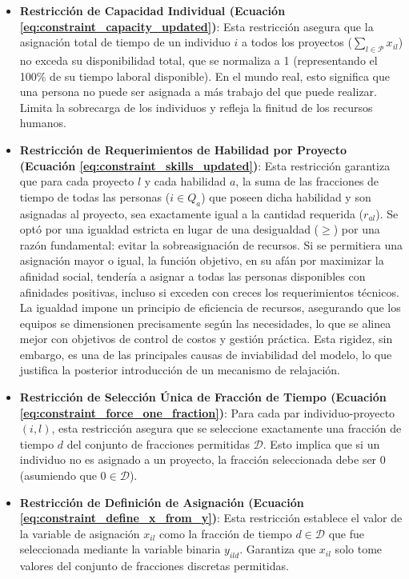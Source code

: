 \documentclass[conference]{IEEEtran}
\begin{document}
\begin{itemize}
    \item \textbf{Restricción de Capacidad Individual (Ecuación \ref{eq:constraint_capacity_updated})}: Esta restricción asegura que la asignación total de tiempo de un individuo \(i\) a todos los proyectos (\(\sum_{l \in \mathcal{P}} x_{il}\)) no exceda su disponibilidad total, que se normaliza a 1 (representando el 100\% de su tiempo laboral disponible). En el mundo real, esto significa que una persona no puede ser asignada a más trabajo del que puede realizar. Limita la sobrecarga de los individuos y refleja la finitud de los recursos humanos.

    \item \textbf{Restricción de Requerimientos de Habilidad por Proyecto (Ecuación \ref{eq:constraint_skills_updated})}: Esta restricción garantiza que para cada proyecto \(l\) y cada habilidad \(a\), la suma de las fracciones de tiempo de todas las personas (\(i \in Q_a\)) que poseen dicha habilidad y son asignadas al proyecto, sea exactamente igual a la cantidad requerida (\(r_{al}\)). Se optó por una igualdad estricta en lugar de una desigualdad (\(\geq\)) por una razón fundamental: evitar la sobreasignación de recursos. Si se permitiera una asignación mayor o igual, la función objetivo, en su afán por maximizar la afinidad social, tendería a asignar a todas las personas disponibles con afinidades positivas, incluso si exceden con creces los requerimientos técnicos. La igualdad impone un principio de eficiencia de recursos, asegurando que los equipos se dimensionen precisamente según las necesidades, lo que se alinea mejor con objetivos de control de costos y gestión práctica. Esta rigidez, sin embargo, es una de las principales causas de inviabilidad del modelo, lo que justifica la posterior introducción de un mecanismo de relajación.

    \item \textbf{Restricción de Selección Única de Fracción de Tiempo (Ecuación \ref{eq:constraint_force_one_fraction})}: Para cada par individuo-proyecto \((i,l)\), esta restricción asegura que se seleccione exactamente una fracción de tiempo \(d\) del conjunto de fracciones permitidas \(\mathcal{D}\). Esto implica que si un individuo no es asignado a un proyecto, la fracción seleccionada debe ser 0 (asumiendo que \(0 \in \mathcal{D}\)).

    \item \textbf{Restricción de Definición de Asignación (Ecuación \ref{eq:constraint_define_x_from_y})}: Esta restricción establece el valor de la variable de asignación \(x_{il}\) como la fracción de tiempo \(d \in \mathcal{D}\) que fue seleccionada mediante la variable binaria \(y_{ild}\). Garantiza que \(x_{il}\) solo tome valores del conjunto de fracciones discretas permitidas.
\end{itemize}
\end{document}

